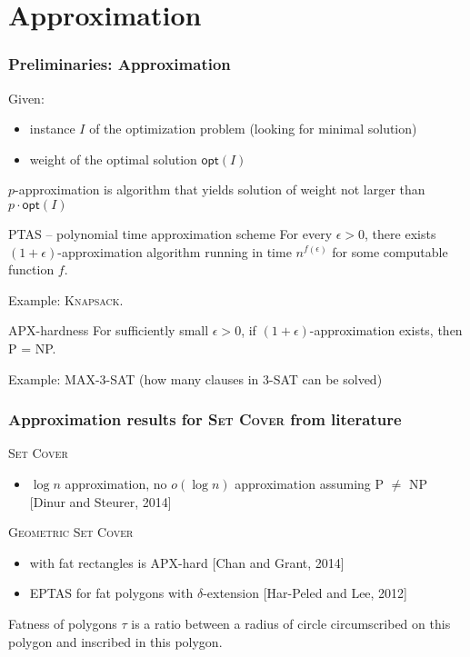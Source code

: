 \documentclass{beamer}
\begin{document}
\section{Approximation}
\begin{frame}
\frametitle{Preliminaries: Approximation}
Given:
\begin{itemize}
\item instance $I$ of the optimization problem (looking for minimal solution)
\item weight of the optimal solution $\mathsf{opt}(I)$
\end{itemize}
$p$-approximation is algorithm that yields solution of weight not larger than
$p\cdot \mathsf{opt}(I)$
\begin{block}{PTAS -- polynomial time approximation scheme}
For every $\epsilon > 0$, there exists $(1+\epsilon)$-approximation
algorithm running in time $n^{f(\epsilon)}$ for some computable function $f$.

Example: \textsc{Knapsack}.

\end{block}

\begin{block}{APX-hardness}
For sufficiently small $\epsilon > 0$,
if $(1+\epsilon)$-approximation exists, then P = NP.

Example: \textsc{MAX-3-SAT} (how many clauses in 3-SAT can be solved)
\end{block}


\end{frame}
\begin{frame}
\frametitle{Approximation results for \textsc{Set Cover} from literature}
\textsc{Set Cover}
\begin{itemize}
\item $\log n$ approximation, no $o(\log n)$ approximation assuming P $\neq$ NP [Dinur and Steurer, 2014]
\end{itemize}

\textsc{Geometric Set Cover}
\begin{itemize}
\item with fat rectangles is APX-hard [Chan and Grant, 2014]
\item EPTAS for fat polygons with $\delta$-extension [Har-Peled and Lee, 2012]
\end{itemize}


\begin{definition}{
Fatness of polygons $\tau$ is a ratio between a radius of circle
circumscribed on this polygon and inscribed in this polygon.
}\end{definition}


\end{frame}
\end{document}
